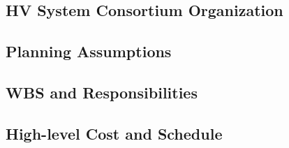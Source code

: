 \subsection{HV System Consortium Organization}
\label{sec:fdsp-hv-org-consortium}


\subsection{Planning Assumptions}
\label{sec:fdsp-hv-org-assmp}


\subsection{WBS and Responsibilities}
\label{sec:fdsp-hv-org-wbs}

\subsection{High-level Cost and Schedule}
\label{sec:fdsp-hv-org-cs}














